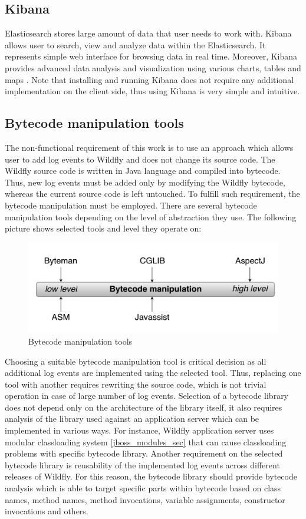 \documentclass[12pt,oneside]{fithesis2}
\begin{document}
\subsection{Kibana}
Elasticsearch stores large amount of data that user needs to work with. Kibana allows user to search, view and analyze data within the Elasticsearch. It represents simple web interface for browsing data in real time. Moreover, Kibana provides advanced data analysis and visualization using various charts, tables and maps \cite[Introduction]{kibana_doc}. Note that installing and running Kibana does not require any additional implementation on the client side, thus using Kibana is very simple and intuitive.

\subsection{Bytecode manipulation tools}
The non-functional requirement of this work is to use an approach which allows user to add log events to Wildfly and does not change its source code. The Wildfly source code is written in Java language and compiled into bytecode. Thus, new log events must be added only by modifying the Wildfly bytecode, whereas the current source code is left untouched. To fulfill such requirement, the bytecode manipulation must be employed. There are several bytecode manipulation tools depending on the level of abstraction they use. The following picture shows selected tools and level they operate on:
\begin{figure}[ht!]
	\centering
	\includegraphics[width=\textwidth]{images/bytecode_tools}
	\caption{Bytecode manipulation tools}
	\label{bytecode_tools}
\end{figure}

Choosing a suitable bytecode manipulation tool is critical decision as all additional log events are implemented using the selected tool. Thus, replacing one tool with another requires rewriting the source code, which is not trivial operation in case of large number of log events. Selection of a bytecode library does not depend only on the architecture of the library itself, it also requires analysis of the library used against an application server which can be implemented in various ways. For instance, Wildfly application server uses modular classloading system \ref{jboss_modules_sec} that can cause classloading problems with specific bytecode library. Another requirement on the selected bytecode library is reusability of the implemented log events across different releases of Wildfly. For this reason, the bytecode library should provide bytecode analysis which is able to target specific parts within bytecode based on class names, method names, method invocations, variable assignments, constructor invocations and others.
\end{document}
